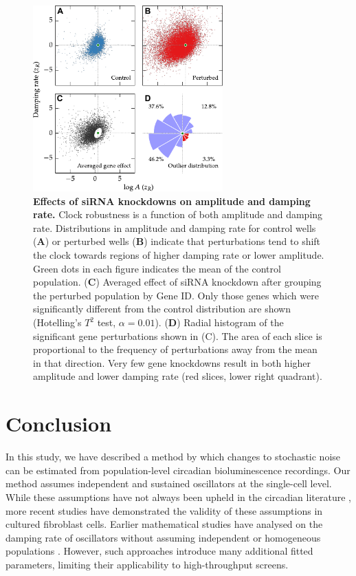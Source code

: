 \documentclass[11pt, letterpaper]{article}
\begin{document}
\begin{figure}[tbp]
  \begin{center}
    \includegraphics[width=0.65\textwidth]{figures/pdfs/outliers.pdf}
  \end{center}
  \caption{{\bfseries Effects of siRNA knockdowns on amplitude and damping rate.}
  Clock robustness is a function of both amplitude and damping rate.
  Distributions in amplitude and damping rate for control wells ({\bfseries A}) or perturbed wells ({\bfseries B}) indicate that perturbations tend to shift the clock towards regions of higher damping rate or lower amplitude. Green dots in each figure indicates the mean of the control population.
({\bfseries C}) Averaged effect of siRNA knockdown after grouping the perturbed population by Gene ID. Only those genes which were significantly different from the control distribution are shown (Hotelling's $T^2$ test, $\alpha = 0.01$).
({\bfseries D}) Radial histogram of the significant gene perturbations shown in (C). The area of each slice is proportional to the frequency of perturbations away from the mean in that direction. Very few gene knockdowns result in both higher amplitude and lower damping rate (red slices, lower right quadrant).
}
\label{fig:outlier_dist}
\end{figure}

\section*{Conclusion}

In this study, we have described a method by which changes to stochastic noise can be estimated from population-level circadian bioluminescence recordings.
Our method assumes independent and sustained oscillators at the single-cell level.
While these assumptions have not always been upheld in the circadian literature \cite{Izumo2003}, more recent studies have demonstrated the validity of these assumptions in cultured fibroblast cells.
Earlier mathematical studies have analysed on the damping rate of oscillators without assuming independent or homogeneous populations \cite{Rougemont2007}.
However, such approaches introduce many additional fitted parameters, limiting their applicability to high-throughput screens.
\end{document}
